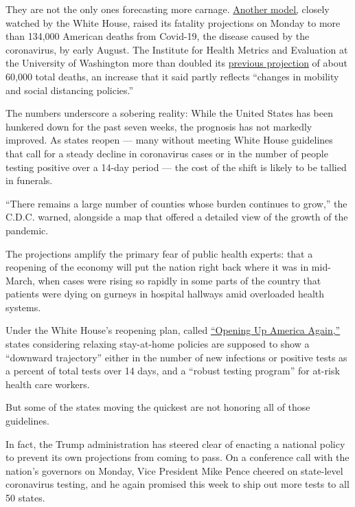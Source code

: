 They are not the only ones forecasting more carnage.
\href{https://covid19.healthdata.org/united-states-of-america}{Another
model,} closely watched by the White House, raised its fatality
projections on Monday to more than 134,000 American deaths from
Covid-19, the disease caused by the coronavirus, by early August. The
Institute for Health Metrics and Evaluation at the University of
Washington more than doubled its
\href{http://www.healthdata.org/news-release/ihme-hold-media-briefing-4-pm-eastern-today-details-below}{previous
projection} of about 60,000 total deaths, an increase that it said
partly reflects ``changes in mobility and social distancing policies.''

The numbers underscore a sobering reality: While the United States has
been hunkered down for the past seven weeks, the prognosis has not
markedly improved. As states reopen --- many without meeting White House
guidelines that call for a steady decline in coronavirus cases or in the
number of people testing positive over a 14-day period --- the cost of
the shift is likely to be tallied in funerals.

``There remains a large number of counties whose burden continues to
grow,'' the C.D.C. warned, alongside a map that offered a detailed view
of the growth of the pandemic.

The projections amplify the primary fear of public health experts: that
a reopening of the economy will put the nation right back where it was
in mid-March, when cases were rising so rapidly in some parts of the
country that patients were dying on gurneys in hospital hallways amid
overloaded health systems.

Under the White House's reopening plan, called
\href{https://www.whitehouse.gov/openingamerica/}{``Opening Up America
Again,''} states considering relaxing stay-at-home policies are supposed
to show a ``downward trajectory'' either in the number of new infections
or positive tests as a percent of total tests over 14 days, and a
``robust testing program'' for at-risk health care workers.

But some of the states moving the quickest are not honoring all of those
guidelines.

In fact, the Trump administration has steered clear of enacting a
national policy to prevent its own projections from coming to pass. On a
conference call with the nation's governors on Monday, Vice President
Mike Pence cheered on state-level coronavirus testing, and he again
promised this week to ship out more tests to all 50 states.

